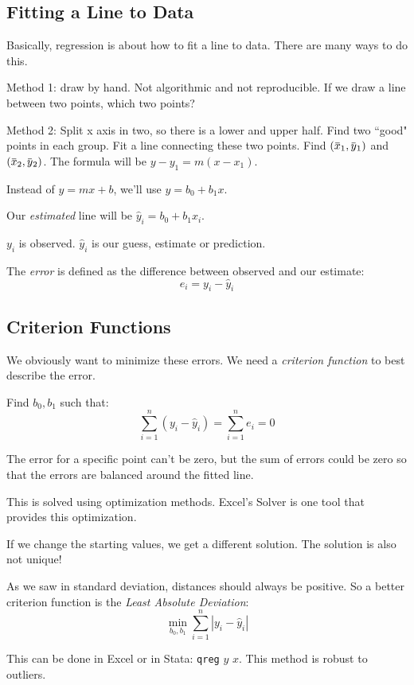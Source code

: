 \documentclass[11pt, oneside]{article}   	%
\newcommand{\overbar}[1]{\mkern 1.5mu\overline{\mkern-1.5mu#1\mkern-1.5mu}\mkern 1.5mu}
\begin{document}
\subsection{Fitting a Line to Data}

Basically, regression is about how to fit a line to data. There are many ways to do this.

Method 1: draw by hand. Not algorithmic and not reproducible. If we draw a line between two points, which two points?

Method 2: Split x axis in two, so there is a lower and upper half. Find two ``good" points in each group. Fit a line connecting these two points. Find $(\overbar{x}_1, \overbar{y}_1)$ and $(\overbar{x}_2, \overbar{y}_2) $. The formula will be  $y - y_1 = m(x - x_1)$.

Instead of $y = mx + b$, we'll use $y = b_0 + b_1 x$. 

Our \textit{estimated} line will be $\hat{y}_i = b_0 + b_1 x_i$.

$y_i$ is observed. $\hat{y}_i$ is our guess, estimate or prediction.

The \textit{error} is defined as the difference between observed and our estimate:
\[
e_i = y_i - \hat{y}_i
\]

\subsection{Criterion Functions}

We obviously want to minimize these errors. We need a \textit{criterion function} to best describe the error.

Find $b_0, b_1$ such that:
\[
\sum\limits_{i=1}^n (y_i - \hat{y}_i) = \sum\limits_{i=1}^n  e_i = 0
\]

The error for a specific point can't be zero, but the sum of errors could be zero so that the errors are balanced around the fitted line.

This is solved using optimization methods. Excel's Solver is one tool that provides this optimization.

If we change the starting values, we get a different solution. The solution is also not unique!

As we saw in standard deviation, distances should always be positive. So a better criterion function is the \textit{Least Absolute Deviation}:
\[
\min_{b_0, b_1} \sum\limits_{i=1}^n |y_i - \hat{y}_i|
\]

This can be done in Excel or in Stata: \texttt{qreg} $y$ $x$. This method is robust to outliers.
\end{document}
